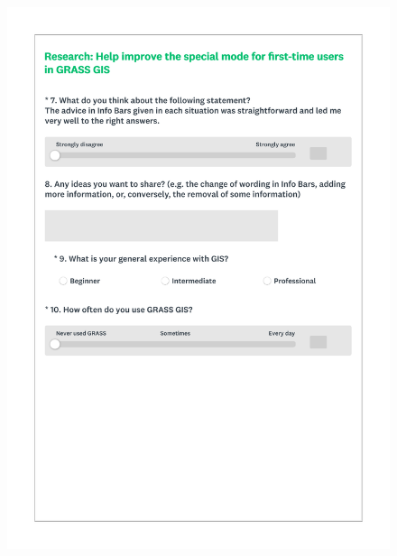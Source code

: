 \documentclass[a4paper,10pt,twoside]{article}
\begin{document}
 \newpage
 \begin{figure}[hbt!]
 \begin{center}
 \includegraphics[width=15.5cm]{../surveys/questionnaires/survey2-page6_questions7_8.pdf}
 \end{center}
 \end{figure}
 
\end{document}
